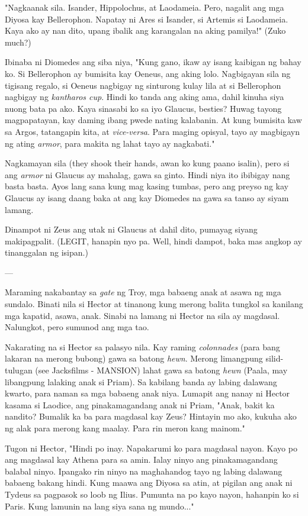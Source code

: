 \documentclass[12pt,letterpaper]{report}
\begin{document}
"Nagkaanak sila. Isander, Hippolochus, at Laodameia. Pero, nagalit ang mga Diyosa kay Bellerophon. Napatay ni Ares si Isander, si Artemis si Laodameia. Kaya ako ay nan dito, upang ibalik ang karangalan na aking pamilya!" (Zuko much?)

Ibinaba ni Diomedes ang siba niya, "Kung gano, ikaw ay isang kaibigan ng bahay ko. Si Bellerophon ay bumisita kay Oeneus, ang aking lolo. Nagbigayan sila ng tigisang regalo, si Oeneus nagbigay ng sinturong kulay lila at si Bellerophon nagbigay ng \textit{kantharos cup}. Hindi ko tanda ang aking ama, dahil kinuha siya nuong bata pa ako. Kaya sinasabi ko sa iyo Glaucus, besties? Huwag tayong magpapatayan, kay daming ibang pwede nating kalabanin. At kung bumisita kaw sa Argos, tatangapin kita, at \textit{vice-versa}. Para maging opisyal, tayo ay magbigayn ng ating \textit{armor}, para makita ng lahat tayo ay nagkabati."

Nagkamayan sila (they shook their hands, awan ko kung paano isalin), pero si ang \textit{armor} ni Glaucus ay mahalag, gawa sa ginto. Hindi niya ito ibibigay nang basta basta. Ayos lang sana kung mag kasing tumbas, pero ang preyso ng kay Glaucus ay isang daang baka at ang kay Diomedes na gawa sa tanso ay siyam lamang.

Dinampot ni Zeus ang utak ni Glaucus at dahil dito, pumayag siyang makipagpalit. (LEGIT, hanapin nyo pa. Well, hindi dampot, baka mas angkop ay tinanggalan ng isipan.)

---

Maraming nakabantay sa \textit{gate} ng Troy, mga babaeng anak at asawa ng mga sundalo. Binati nila si Hector at tinanong kung merong balita tungkol sa kanilang mga kapatid, asawa, anak. Sinabi na lamang ni Hector na sila ay magdasal. Nalungkot, pero sumunod ang mga tao.

Nakarating na si Hector sa palasyo nila. Kay raming \textit{colonnades} (para bang lakaran na merong bubong) gawa sa batong \textit{hewn}. Merong limangpung silid-tulugan (see Jacksfilms - MANSION) lahat gawa sa batong \textit{hewn} (Paala, may libangpung lalaking anak si Priam). Sa kabilang banda ay labing dalawang kwarto, para naman sa mga babaeng anak niya. Lumapit ang nanay ni Hector kasama si Laodice, ang pinakamagandang anak ni Priam, "Anak, bakit ka nandito? Bumalik ka ba para magdasal kay Zeus? Hintayin mo ako, kukuha ako ng alak para merong kang maalay. Para rin meron kang mainom."

Tugon ni Hector, "Hindi po inay. Napakarumi ko para magdasal nayon. Kayo po ang magdasal kay Athena para sa amin. Ialay ninyo ang pinakamagandang balabal ninyo. Ipangako rin ninyo na maghahandog tayo ng labing dalawang babaeng bakang hindi. Kung maawa ang Diyosa sa atin, at pigilan ang anak ni Tydeus sa pagpasok so loob ng Ilius. Pumunta na po kayo nayon, hahanpin ko si Paris. Kung lamunin na lang siya sana ng mundo..." 
\end{document}

